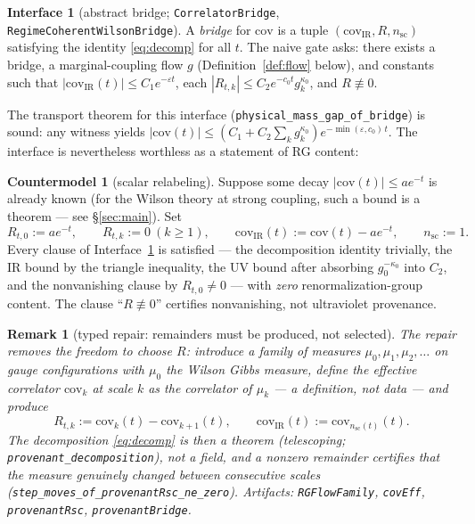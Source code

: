 \documentclass[11pt]{article}
\newtheorem{remark}[theorem]{Remark}
\theoremstyle{definition}
\newtheorem{interface}[theorem]{Interface}
\newtheorem{countermodel}[theorem]{Countermodel}
\newcommand{\lean}[1]{\texttt{#1}}
\begin{document}
\begin{interface}[abstract bridge; \lean{CorrelatorBridge},
\lean{RegimeCoherentWilsonBridge}]\label{int:abstract}
A \emph{bridge} for $\mathrm{cov}$ is a tuple
$(\mathrm{cov}_{\mathrm{IR}}, R, n_{\mathrm{sc}})$ satisfying the
identity \eqref{eq:decomp} for all $t$.  The naive gate asks: there
exists a bridge, a marginal-coupling flow $g$
(Definition~\ref{def:flow} below), and constants such that
$|\mathrm{cov}_{\mathrm{IR}}(t)| \le C_1 e^{-\varepsilon t}$, each
$|R_{t,k}| \le C_2 e^{-c_0 t} g_k^{\kappa_0}$, and $R \not\equiv 0$.
\end{interface}

The transport theorem for this interface
(\lean{physical\_mass\_gap\_of\_bridge}) is sound: any witness yields
$|\mathrm{cov}(t)| \le (C_1 + C_2 \sum_k g_k^{\kappa_0})
e^{-\min(\varepsilon, c_0)\, t}$.  The interface is nevertheless
worthless as a statement of RG content:

\begin{countermodel}[scalar relabeling]\label{cm:relabel}
Suppose some decay $|\mathrm{cov}(t)| \le a e^{-t}$ is already known
(for the Wilson theory at strong coupling, such a bound is a theorem
--- see \S\ref{sec:main}).  Set
\[
R_{t,0} := a e^{-t}, \qquad R_{t,k} := 0 \ (k \ge 1), \qquad
\mathrm{cov}_{\mathrm{IR}}(t) := \mathrm{cov}(t) - a e^{-t}, \qquad
n_{\mathrm{sc}} := 1 .
\]
Every clause of Interface~\ref{int:abstract} is satisfied --- the
decomposition identity trivially, the IR bound by the triangle
inequality, the UV bound after absorbing $g_0^{-\kappa_0}$ into $C_2$,
and the nonvanishing clause by $R_{t,0} \ne 0$ --- with \emph{zero}
renormalization-group content.  The clause ``$R \not\equiv 0$''
certifies nonvanishing, not ultraviolet provenance.
\end{countermodel}

\begin{remark}[typed repair: remainders must be produced, not selected]
\label{rem:repair1}
The repair removes the freedom to choose $R$: introduce a family of
measures $\mu_0, \mu_1, \mu_2, \dots$ on gauge configurations with
$\mu_0$ the Wilson Gibbs measure, define the \emph{effective
correlator} $\mathrm{cov}_k$ at scale $k$ as the correlator \emph{of}
$\mu_k$ --- a definition, not data --- and \emph{produce}
\[
R_{t,k} := \mathrm{cov}_k(t) - \mathrm{cov}_{k+1}(t), \qquad
\mathrm{cov}_{\mathrm{IR}}(t) := \mathrm{cov}_{n_{\mathrm{sc}}(t)}(t).
\]
The decomposition \eqref{eq:decomp} is then a \emph{theorem}
(telescoping; \lean{provenant\_decomposition}), not a field, and a
nonzero remainder certifies that the measure genuinely changed between
consecutive scales
(\lean{step\_moves\_of\_provenantRsc\_ne\_zero}).
Artifacts: \lean{RGFlowFamily}, \lean{covEff}, \lean{provenantRsc},
\lean{provenantBridge}.
\end{remark}
\end{document}
